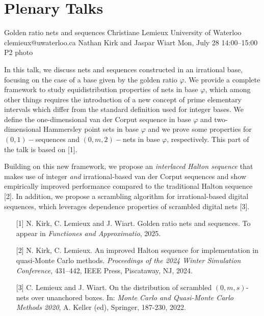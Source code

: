 \chapter{Plenary Talks}
\newpage

\begin{talk}
  {Golden ratio nets and sequences}%
  {Christiane Lemieux}%
  {University of Waterloo}%
  {clemieux@uwaterloo.ca}%
  {Nathan Kirk and Jaspar Wiart}%
  {}%
  {Mon, July 28 14:00–15:00}%
  {P2}%
  {photo}%
  
				
			

In this talk, we discuss nets and sequences constructed in an irrational base, focusing on the case of a base given by the golden ratio $\varphi$. We provide a complete framework to study equidistribution properties of nets in base $\varphi$, which among other things requires the introduction of a new concept of prime elementary intervals which differ from the standard definition used for integer bases. We define the one-dimensional van der Corput sequence in base $\varphi$ and two-dimensional Hammersley point sets in base $\varphi$ and we prove some properties for $(0,1)-$sequences and $(0,m,2)-$nets in base $\varphi$, respectively. This part of the talk is based on [1].


Building on this new framework, we propose 
an {\em interlaced Halton sequence} that makes use of integer \textit{and} irrational-based van der Corput sequences and show empirically improved performance compared to the traditional Halton sequence [2]. In addition, we propose a scrambling algorithm for irrational-based digital sequences, which leverages dependence properties of scrambled digital nets [3].

\medskip

\begin{enumerate}
	\item[{[1]}] N. Kirk, C. Lemieux and J. Wiart. Golden ratio nets and sequences. To appear in {\em Functiones and Approximatio}, 2025.
	\item[{[2]}] N. Kirk, C. Lemieux. An improved Halton sequence for implementation in quasi-Monte Carlo methods. {\em Proceedings of the 2024 Winter Simulation Conference}, 431--442, IEEE Press, Piscataway, NJ, 2024. 
    \item[{[3]}] C. Lemieux and J. Wiart. On the distribution of scrambled $(0, m, s)$-nets over unanchored
boxes. In: {\em Monte Carlo and Quasi-Monte Carlo Methods 2020}, A. Keller (ed), 
Springer, 187-230, 2022.
\end{enumerate}

\end{talk}


